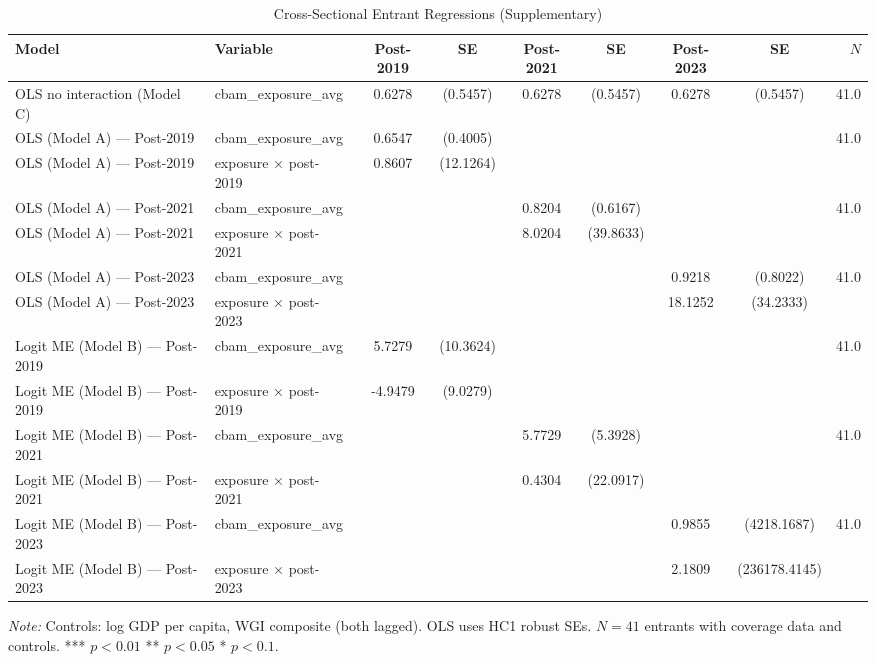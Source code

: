 \documentclass[12pt,a4paper]{article}
\begin{document}
\begin{table}[htbp]
\centering
\begin{threeparttable}
\caption{Cross-Sectional Entrant Regressions (Supplementary)}\label{tab:entrant_reg}
\small
\begin{tabular}{llccccccr}
\toprule
Model & Variable & Post-2019 & SE & Post-2021 & SE & Post-2023 & SE & $N$ \\
\midrule
OLS no interaction (Model C) & cbam\_exposure\_avg & 0.6278 & (0.5457) & 0.6278 & (0.5457) & 0.6278 & (0.5457) & 41.0 \\
OLS (Model A) — Post-2019 & cbam\_exposure\_avg & 0.6547 & (0.4005) &  &  &  &  & 41.0 \\
OLS (Model A) — Post-2019 & exposure × post-2019 & 0.8607 & (12.1264) &  &  &  &  &  \\
OLS (Model A) — Post-2021 & cbam\_exposure\_avg &  &  & 0.8204 & (0.6167) &  &  & 41.0 \\
OLS (Model A) — Post-2021 & exposure × post-2021 &  &  & 8.0204 & (39.8633) &  &  &  \\
OLS (Model A) — Post-2023 & cbam\_exposure\_avg &  &  &  &  & 0.9218 & (0.8022) & 41.0 \\
OLS (Model A) — Post-2023 & exposure × post-2023 &  &  &  &  & 18.1252 & (34.2333) &  \\
Logit ME (Model B) — Post-2019 & cbam\_exposure\_avg & 5.7279 & (10.3624) &  &  &  &  & 41.0 \\
Logit ME (Model B) — Post-2019 & exposure × post-2019 & -4.9479 & (9.0279) &  &  &  &  &  \\
Logit ME (Model B) — Post-2021 & cbam\_exposure\_avg &  &  & 5.7729 & (5.3928) &  &  & 41.0 \\
Logit ME (Model B) — Post-2021 & exposure × post-2021 &  &  & 0.4304 & (22.0917) &  &  &  \\
Logit ME (Model B) — Post-2023 & cbam\_exposure\_avg &  &  &  &  & 0.9855 & (4218.1687) & 41.0 \\
Logit ME (Model B) — Post-2023 & exposure × post-2023 &  &  &  &  & 2.1809 & (236178.4145) &  \\
\bottomrule
\end{tabular}
\begin{tablenotes}\small
\item \textit{Note:} Controls: log GDP per capita, WGI composite (both lagged). OLS uses HC1 robust SEs. $N=41$ entrants with coverage data and controls. *** $p<0.01$ ** $p<0.05$ * $p<0.1$.
\end{tablenotes}
\end{threeparttable}
\end{table}
\end{document}

